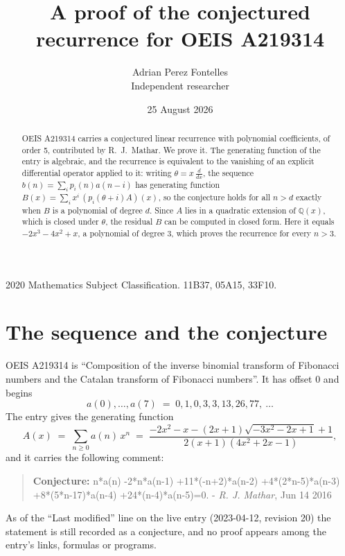 \documentclass[11pt,a4paper]{article}
\title{A proof of the conjectured recurrence for OEIS A219314}
\author{Adrian Perez Fontelles\\ \small Independent researcher}
\date{25 August 2026}
\theoremstyle{plain}
\theoremstyle{definition}
\begin{document}
\maketitle

\begin{abstract}
OEIS A219314 carries a conjectured linear recurrence with polynomial coefficients, of
order 5, contributed by R.~J.~Mathar. We prove it. The generating function of the
entry is algebraic, and the recurrence is equivalent to the vanishing of an explicit
differential operator applied to it: writing $\theta=x\,\frac{d}{dx}$, the sequence
$b(n)=\sum_{i}p_{i}(n)a(n-i)$ has generating function
$B(x)=\sum_{i}x^{i}\,(p_{i}(\theta+i)A)(x)$, so the conjecture holds for all $n>d$ exactly
when $B$ is a polynomial of degree $d$. Since $A$ lies in a quadratic extension of
$\mathbb{Q}(x)$, which is closed under $\theta$, the residual $B$ can be computed in
closed form. Here it equals $- 2 x^{3} - 4 x^{2} + x$, a polynomial of degree $3$, which proves
the recurrence for every $n>3$.
\end{abstract}

\noindent\small 2020 Mathematics Subject Classification. 11B37, 05A15, 33F10.\normalsize

\section{The sequence and the conjecture}

OEIS A219314 is ``Composition of the inverse binomial transform of Fibonacci numbers and the Catalan transform of Fibonacci numbers''. It has offset $0$ and begins
\[
a(0),\dots,a(7)\;=\;0, 1, 0, 3, 3, 13, 26, 77,\ \dots
\]
The entry gives the generating function
\begin{equation}\label{eq:gf}
A(x)\;=\;\sum_{n\ge 0} a(n)\,x^{n}\;=\;\frac{- 2 x^{2} - x - \left(2 x + 1\right) \sqrt{- 3 x^{2} - 2 x + 1} + 1}{2 \left(x + 1\right) \left(4 x^{2} + 2 x - 1\right)} ,
\end{equation}
and it carries the following comment:
\begin{quote}\small
\textbf{Conjecture:} n*a(n) -2*n*a(n-1) +11*(-n+2)*a(n-2) +4*(2*n-5)*a(n-3) +8*(5*n-17)*a(n-4) +24*(n-4)*a(n-5)=0. - \emph{R. J. Mathar}, Jun 14 2016
\end{quote}
As of the ``Last modified'' line on the live entry (2023-04-12, revision 20) the
statement is still recorded as a conjecture, and no proof appears among the entry's links,
formulas or programs.
\end{document}
